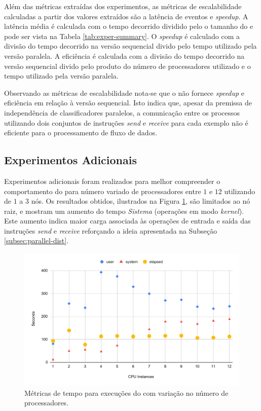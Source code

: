 Além das métricas extraídas dos experimentos, as métricas de escalabilidade
calculadas a partir dos valores extraídos são a latência de eventos e
\emph{speedup}. %
A latência média é calculada com o tempo decorrido dividido pelo o tamanho do
\dataset e pode ser vista na Tabela \ref{tab:exper-summary}.
O \emph{speedup} é calculado com a divisão do tempo decorrido na versão
sequencial divido pelo tempo utilizado pela versão paralela.
A eficiência é calculada com a divisão do tempo decorrido na versão sequencial
divido pelo produto do número de processadores utilizado e o tempo utilizado
pela versão paralela.

Observando as métricas de escalabilidade nota-se que o \mfog não fornece
\emph{speedup} e eficiência em relação à versão sequencial.
Isto indica que, apesar da premissa de independência de classificadores
paralelos, a comunicação entre os processos utilizando dois conjuntos de
instruções \mpi \emph{send} e \emph{receive} para cada exemplo não é eficiente
para o processamento de fluxo de dados.

\subsection{Experimentos Adicionais}

Experimentos adicionais foram realizados para melhor compreender o comportamento do \mfog
para número variado de processadores entre $1$ e $12$ utilizando de $1$ a $3$ nós.
Os resultados obtidos, ilustrados na Figura \ref{fig:speedup}, são limitados ao
nó raiz, e mostram um aumento do tempo \emph{Sistema} (operações em modo
\emph{kernel}).
Este aumento indica maior carga associada às operações de entrada e saída das
instruções \emph{send} e \emph{receive} reforçando a ideia apresentada na
Subseção \ref{subsec:parallel-dist}.

\begin{figure}[t]
  \centering
  \includegraphics[width=0.65\linewidth,page=1]{experiments/speedup-clean.pdf}
  \caption{Métricas de tempo para execuções do \mfog com variação no número de processadores.}
  \label{fig:speedup}
\end{figure}

